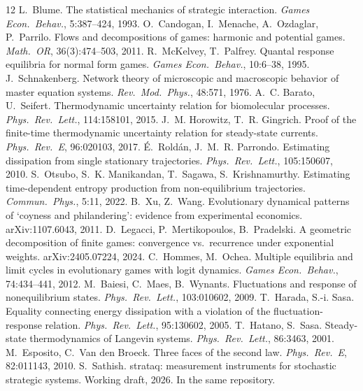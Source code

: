 \documentclass[11pt]{article}
\begin{document}

\begin{thebibliography}{12}
 L.~Blume. The statistical mechanics of strategic interaction. \emph{Games Econ.\ Behav.}, 5:387--424, 1993.
 O.~Candogan, I.~Menache, A.~Ozdaglar, P.~Parrilo. Flows and decompositions of games: harmonic and potential games. \emph{Math.\ OR}, 36(3):474--503, 2011.
 R.~McKelvey, T.~Palfrey. Quantal response equilibria for normal form games. \emph{Games Econ.\ Behav.}, 10:6--38, 1995.
 J.~Schnakenberg. Network theory of microscopic and macroscopic behavior of master equation systems. \emph{Rev.\ Mod.\ Phys.}, 48:571, 1976.
 A.~C. Barato, U.~Seifert. Thermodynamic uncertainty relation for biomolecular processes. \emph{Phys.\ Rev.\ Lett.}, 114:158101, 2015.
 J.~M. Horowitz, T.~R. Gingrich. Proof of the finite-time thermodynamic uncertainty relation for steady-state currents. \emph{Phys.\ Rev.\ E}, 96:020103, 2017.
 \'E.~Rold\'an, J.~M.~R. Parrondo. Estimating dissipation from single stationary trajectories. \emph{Phys.\ Rev.\ Lett.}, 105:150607, 2010.
 S.~Otsubo, S.~K. Manikandan, T.~Sagawa, S.~Krishnamurthy. Estimating time-dependent entropy production from non-equilibrium trajectories. \emph{Commun.\ Phys.}, 5:11, 2022.
 B.~Xu, Z.~Wang. Evolutionary dynamical patterns of `coyness and philandering': evidence from experimental economics. arXiv:1107.6043, 2011.
 D.~Legacci, P.~Mertikopoulos, B.~Pradelski. A geometric decomposition of finite games: convergence vs.\ recurrence under exponential weights. arXiv:2405.07224, 2024.
 C.~Hommes, M.~Ochea. Multiple equilibria and limit cycles in evolutionary games with logit dynamics. \emph{Games Econ.\ Behav.}, 74:434--441, 2012.
 M.~Baiesi, C.~Maes, B.~Wynants. Fluctuations and response of nonequilibrium states. \emph{Phys.\ Rev.\ Lett.}, 103:010602, 2009.
 T.~Harada, S.-i. Sasa. Equality connecting energy dissipation with a violation of the fluctuation-response relation. \emph{Phys.\ Rev.\ Lett.}, 95:130602, 2005.
 T.~Hatano, S.~Sasa. Steady-state thermodynamics of Langevin systems. \emph{Phys.\ Rev.\ Lett.}, 86:3463, 2001.
 M.~Esposito, C.~Van den Broeck. Three faces of the second law. \emph{Phys.\ Rev.\ E}, 82:011143, 2010.
 S.~Sathish. strataq: measurement instruments for stochastic strategic systems. Working draft, 2026. In the same repository.
\end{thebibliography}
\end{document}
